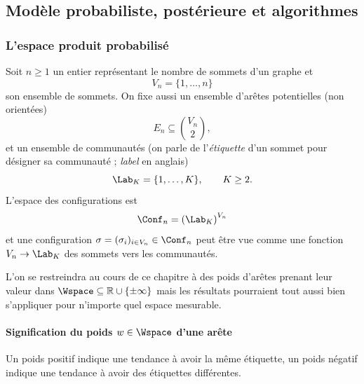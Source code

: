 \subsection{Modèle probabiliste, postérieure et algorithmes}
\label{sec:chapII_modele_bayesien}

\subsubsection{L'espace produit probabilisé}

Soit $n\geq1$ un entier représentant le nombre de sommets d'un graphe et
\[
    V_n=\{1,\ldots,n\}
\]
son ensemble de sommets. On fixe aussi un ensemble d'arêtes potentielles (non orientées)
\[
    E_n\subseteq \binom{V_n}{2},
\]
et un ensemble de communautés (on parle de l'\emph{étiquette} d'un sommet pour désigner sa communauté ; \emph{label} en anglais)
\[
    \Lab_K=\{1,\ldots,K\},\qquad K\geq2.
\]
L'espace des configurations est
\[
    \Conf_n=\left(\Lab_K\right)^{V_n}
\]
et une configuration $\sigma=(\sigma_i)_{i\in V_n} \in \Conf_n$ peut être vue comme une fonction $V_n \to \Lab_K$ des sommets vers les communautés.

L'on se restreindra au cours de ce chapitre à des poids d'arêtes prenant leur valeur dans $\Wspace\subseteq\mathbb R\cup\{\pm\infty\}$ mais les résultats pourraient tout aussi bien s'appliquer pour n'importe quel espace mesurable. 

\paragraph{Signification du poids $w \in \Wspace$ d'une arête} 
Un poids positif indique une tendance à avoir la même étiquette, un poids négatif indique une tendance à avoir des étiquettes différentes. %

